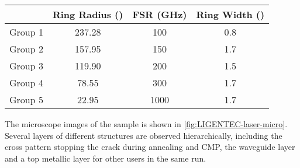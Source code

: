 \begin{table}[]
	\label{tab:ligentec}
	\begin{tabular}{cccc}
		& Ring Radius (\um) & FSR (GHz) & Ring Width (\um) \\ \hline
		Group 1 & 237.28                                                 & 100       & 0.8                                                   \\ \hline
		Group 2 & 157.95                                                 & 150       & 1.7                                                   \\ \hline
		Group 3 & 119.90                                                 & 200       & 1.5                                                   \\ \hline
		Group 4 & 78.55                                                  & 300       & 1.7                                                   \\ \hline
		Group 5 & 22.95                                                  & 1000      & 1.7                                                   \\ \hline
	\end{tabular}
\end{table}

The microscope images of the sample is shown in \autoref{fig:LIGENTEC-laser-micro}. Several layers of different structures are observed hierarchically, including the cross pattern stopping the crack during annealing and CMP, the waveguide layer and a top metallic layer for other users in the same run.

\begin{figure}
	\centering
	
	\label{fig:gds}
\end{figure}

\begin{figure}
	\centering
	
	\label{fig:LIGENTEC-laser-micro}
\end{figure}

